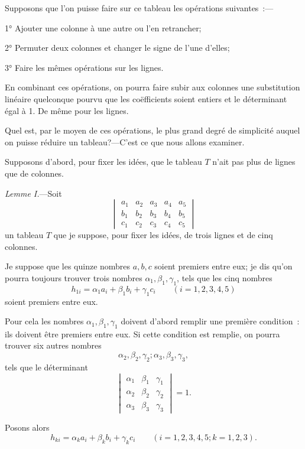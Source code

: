 \documentclass{article}
\begin{document}
Supposons que l'on puisse faire sur ce tableau les opérations suivantes~:---

1° Ajouter une colonne à une autre ou l'en retrancher;

2° Permuter deux colonnes et changer le signe de l'une d'elles;

3° Faire les mêmes opérations sur les lignes.

En combinant ces opérations, on pourra faire subir aux colonnes une substitution linéaire quelconque pourvu que les coëfficients soient entiers et le déterminant égal à 1. De même pour les lignes.

Quel est, par le moyen de ces opérations, le plus grand degré de simplicité auquel on puisse réduire un tableau?---C'est ce que nous allons examiner.

Supposons d'abord, pour fixer les idées, que le tableau $T$ n'ait pas plus de lignes que de colonnes.

\emph{Lemme I.}---Soit
\[ \begin{vmatrix} a_{1} & a_{2} & a_{3} & a_{4} & a_{5} \\[1ex] b_{1} & b_{2} & b_{3} & b_{4} & b_{5} \\[1ex] c_{1} & c_{2} & c_{3} & c_{4} & c_{5} \end{vmatrix} \]
un tableau $T$ que je suppose, pour fixer les idées, de trois lignes et de cinq colonnes.

Je suppose que les quinze nombres $a, b, c$ soient premiers entre eux; je dis qu'on pourra toujours trouver trois nombres $\alpha_{1}, \beta_{1}, \gamma_{1}$, tels que les cinq nombres
\[ h_{1i} = \alpha_{1} a_{i} + \beta_{1} b_{i} + \gamma_{1} c_{i} \qquad (i = 1, 2, 3, 4, 5) \]
soient premiers entre eux.

Pour cela les nombres $\alpha_{1}, \beta_{1}, \gamma_{1}$ doivent d'abord remplir une première
condition~: ils doivent être premiers entre eux. Si cette condition est remplie, on pourra trouver six autres nombres
\[ \alpha_{2}, \beta_{2}, \gamma_{2}; \alpha_{3}, \beta_{3}, \gamma_{3}, \]
tels que le déterminant
\[ \begin{vmatrix} \alpha_{1} & \beta_{1} & \gamma_{1} \\[1ex] \alpha_{2} & \beta_{2} & \gamma_{2} \\[1ex] \alpha_{3} & \beta_{3} & \gamma_{3} \end{vmatrix} = 1. \]

Posons alors
\[ h_{ki} = \alpha_{k} a_{i} + \beta_{k} b_{i} + \gamma_{k} c_{i} \qquad (i = 1, 2, 3, 4, 5; k = 1, 2, 3). \]
\end{document}
